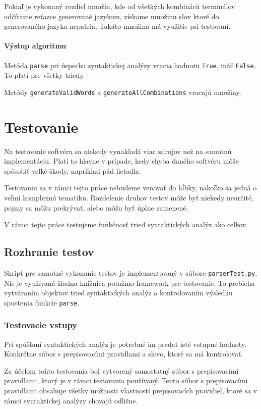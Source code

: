 Pokiaľ je vykonaný rozdiel množín, kde od všetkých kombinácii terminálov odčítame reťazce generované jazykom, získame množinu slov ktoré do generovaného jazyka nepatria. Takáto množina má využitie pri testovaní.

\subsubsection{Výstup algoritmu}
Metóda \texttt{parse} pri úspechu syntaktickej analýzy vracia hodnotu \texttt{True}, ináč \texttt{False}. To platí pre všetky triedy.

Metódy \texttt{generateValidWords} a \texttt{generateAllCombinations} vracajú množiny.

\chapter{Testovanie}
\label{testovanie}
Na testovanie softvéru sa niekedy vynakladá viac zdrojov než na samotnú implementáciu. Platí to hlavne v prípade, kedy chyba daného softvéru môže spôsobiť veľké škody, napríklad pád lietadla.

Testovaniu sa v rámci tejto práce nebudeme venovať do hĺbky, nakoľko sa jedná o veľmi komplexnú tematiku. Rozdelenie druhov testov môže byť niekedy neurčité, pojmy sa môžu prekrývať, alebo môžu byť úplne zamenené.

V rámci tejto práce testujeme funkčnosť tried syntaktických analýz ako celkov.

\section{Rozhranie testov}
Skript pre samotné vykonanie testov je implementovaný v súbore \texttt{parserTest.py}. Nie je využívaná žiadna knižnica poťažmo framework pre testovanie. To prebieha vytváraním objektov tried syntaktických analýz a kontrolovaním výsledku spustenia funkcie \texttt{parse}.


\subsection*{Testovacie vstupy}
Pri spúšťaní syntaktických analýz je potrebné im predať isté vstupné hodnoty. Konkrétne súbor s prepisovacími pravidlami a slovo, ktoré sa má kontrolovať.

Za účelom tohto testovania bol vytvorený samostatný súbor s prepisovacími pravidlami, ktorý je v rámci testovania používaný. Tento súbor s prepisovacími pravidlami obsahuje všetky možnosti vlastností prepisovacích pravidiel, ktoré sa v rámci syntaktickej analýzy chovajú odlišne.

